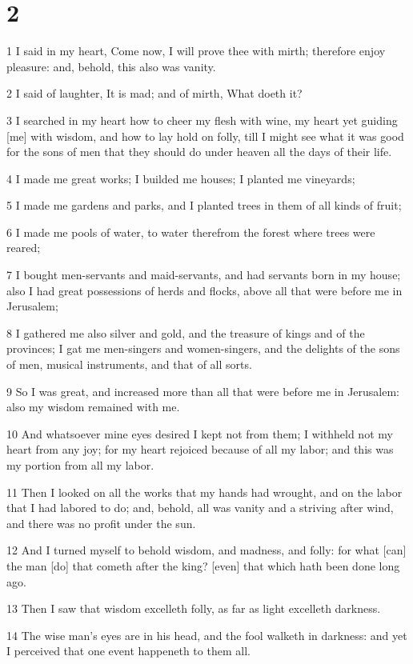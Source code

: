 \chapter{2}

\par 1 I said in my heart, Come now, I will prove thee with mirth; therefore enjoy pleasure: and, behold, this also was vanity.
\par 2 I said of laughter, It is mad; and of mirth, What doeth it?
\par 3 I searched in my heart how to cheer my flesh with wine, my heart yet guiding [me] with wisdom, and how to lay hold on folly, till I might see what it was good for the sons of men that they should do under heaven all the days of their life.
\par 4 I made me great works; I builded me houses; I planted me vineyards;
\par 5 I made me gardens and parks, and I planted trees in them of all kinds of fruit;
\par 6 I made me pools of water, to water therefrom the forest where trees were reared;
\par 7 I bought men-servants and maid-servants, and had servants born in my house; also I had great possessions of herds and flocks, above all that were before me in Jerusalem;
\par 8 I gathered me also silver and gold, and the treasure of kings and of the provinces; I gat me men-singers and women-singers, and the delights of the sons of men, musical instruments, and that of all sorts.
\par 9 So I was great, and increased more than all that were before me in Jerusalem: also my wisdom remained with me.
\par 10 And whatsoever mine eyes desired I kept not from them; I withheld not my heart from any joy; for my heart rejoiced because of all my labor; and this was my portion from all my labor.
\par 11 Then I looked on all the works that my hands had wrought, and on the labor that I had labored to do; and, behold, all was vanity and a striving after wind, and there was no profit under the sun.
\par 12 And I turned myself to behold wisdom, and madness, and folly: for what [can] the man [do] that cometh after the king? [even] that which hath been done long ago.
\par 13 Then I saw that wisdom excelleth folly, as far as light excelleth darkness.
\par 14 The wise man's eyes are in his head, and the fool walketh in darkness: and yet I perceived that one event happeneth to them all.
